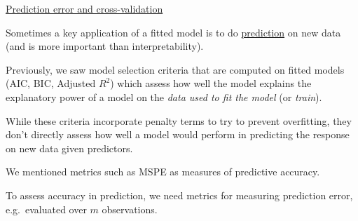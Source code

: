 \underline{Prediction error and cross-validation}

Sometimes a key application of a fitted model
is to do \underline{prediction} on new data
(and is more important than interpretability).

Previously, we saw model selection criteria
that are computed on fitted models
(AIC, BIC, Adjusted $ R^2 $) which assess how
well the model explains the explanatory
power of a model on the \emph{data used to fit the model}
(or \emph{train}).

While these criteria incorporate penalty terms to try
to prevent overfitting, they don't directly assess
how well a model would perform in predicting the response
on new data given predictors.

We mentioned metrics such as MSPE as measures of predictive
accuracy.

To assess accuracy in prediction, we need metrics for
measuring prediction error, e.g.\ evaluated
over $ m $ observations.

